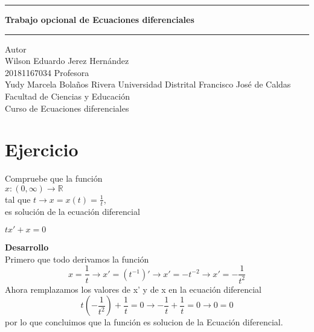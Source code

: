 \documentclass[12pt]{article}
\begin{document}
\pagestyle{empty}
\begin{center}
\begin{figure}[h]
\centering


\end{figure}
\Large
\hrule
\vspace{4mm}
\textbf{Trabajo opcional de Ecuaciones diferenciales}\\

\vspace{4mm}
\hrule
\large
\vfill
Autor\\

Wilson Eduardo Jerez Hernández \\
20181167034
\vfill
Profesora\\

Yudy Marcela Bolaños Rivera
\vfill
Universidad Distrital Francisco José de Caldas\\
Facultad de Ciencias y Educación\\
Curso de Ecuaciones diferenciales\\
\end{center}
\newpage
\section{Ejercicio}
Compruebe que la función \\ 
$x:(0, \infty) \to \mathbb{R}$ \\
tal que $t \to x = x(t) = \frac{1}{t}$, \\ 
es solución de la ecuación diferencial \\
\begin{center}
    $tx'+x=0$
\end{center}
\textbf{Desarrollo}\\ 
Primero que todo derivamos la función\\ 
\begin{equation*}
    x = \frac{1}{t} \to x'=(t^{-1})' \to x'=-t^{-2} \to x'=-\frac{1}{t^{2}}
\end{equation*}
Ahora remplazamos los valores de x' y de x en la ecuación diferencial 
\begin{equation}
    t(-\frac{1}{t^{2}})+\frac{1}{t} = 0 \to -\frac{1}{t}+\frac{1}{t}=0 \to 0=0
\end{equation}
por lo que concluimos que la función es solucion de la Ecuación diferencial.
\end{document}
